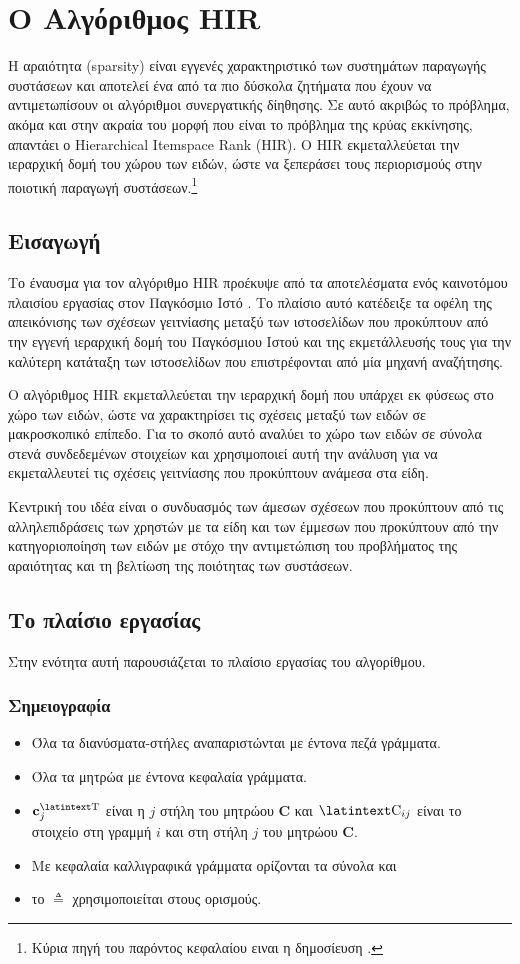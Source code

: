 \chapter{Ο Αλγόριθμος {\en HIR}}
\label{Chapter3}
Η αραιότητα ({\en sparsity}) είναι εγγενές χαρακτηριστικό των συστημάτων παραγωγής συστάσεων και αποτελεί ένα από τα πιο δύσκολα ζητήματα που έχουν να αντιμετωπίσουν οι αλγόριθμοι συνεργατικής δίηθησης. Σε αυτό ακριβώς το πρόβλημα, ακόμα και στην ακραία του μορφή που είναι το πρόβλημα της κρύας εκκίνησης, απαντάει ο {\en Hierarchical Itemspace Rank (HIR). O HIR} εκμεταλλεύεται την ιεραρχική δομή του χώρου των ειδών, ώστε να ξεπεράσει τους περιορισμούς στην ποιοτική παραγωγή συστάσεων\cite{Nikolakopoulos2015126}.\footnote{Κύρια πηγή του παρόντος κεφαλαίου ειναι η δημοσίευση \cite{Nikolakopoulos2015126}.}
\section{Εισαγωγή}
Το έναυσμα για τον αλγόριθμο {\en HIR} προέκυψε από τα αποτελέσματα ενός καινοτόμου πλαισίου εργασίας στον Παγκόσμιο Ιστό \cite{Nikolakopoulos:2013:NNR:2433396.2433415}. Το πλαίσιο αυτό κατέδειξε τα οφέλη της απεικόνισης των σχέσεων γειτνίασης μεταξύ των ιστοσελίδων που προκύπτουν από την εγγενή ιεραρχική δομή του Παγκόσμιου Ιστού και της εκμετάλλευσής τους για την καλύτερη κατάταξη των ιστοσελίδων που επιστρέφονται από μία μηχανή αναζήτησης. \par
Ο αλγόριθμος {\en HIR} εκμεταλλεύεται την ιεραρχική δομή που υπάρχει εκ φύσεως στο χώρο των ειδών, ώστε να χαρακτηρίσει τις σχέσεις μεταξύ των ειδών σε μακροσκοπικό επίπεδο. Για το σκοπό αυτό αναλύει το χώρο των ειδών σε σύνολα στενά συνδεδεμένων στοιχείων και χρησιμοποιεί αυτή την ανάλυση για να εκμεταλλευτεί τις σχέσεις γειτνίασης που προκύπτουν ανάμεσα στα είδη. \par
Κεντρική του ιδέα είναι ο συνδυασμός των άμεσων σχέσεων που προκύπτουν από τις αλληλεπιδράσεις των χρηστών με τα είδη και των έμμεσων που προκύπτουν από την κατηγοριοποίηση των ειδών με στόχο την αντιμετώπιση του προβλήματος της αραιότητας και τη βελτίωση της ποιότητας των συστάσεων.
\section{Το πλαίσιο εργασίας}
Στην ενότητα αυτή παρουσιάζεται το πλαίσιο εργασίας του αλγορίθμου.
\subsection{Σημειογραφία}
\begin{itemize}
 \item Όλα τα διανύσματα-στήλες αναπαριστώνται με έντονα πεζά γράμματα.
 \item Όλα τα μητρώα με έντονα κεφαλαία γράμματα.
 \item $\mathbf{c}_j^\text{\en T}$ είναι η $j$ στήλη του μητρώου $\mathbf{C}$ και $\text{\en C}_{ij}$ είναι το στοιχείο στη γραμμή $i$ και στη στήλη $j$ του μητρώου $\mathbf{C}$.
 \item Με κεφαλαία καλλιγραφικά γράμματα ορίζονται τα σύνολα και
 \item το $\triangleq$ χρησιμοποιείται στους ορισμούς.
\end{itemize}
